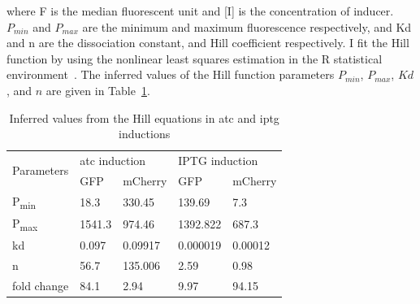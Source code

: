 \noindent where F is the median fluorescent unit and [I] is the concentration of inducer. $P_{min}$ and $P_{max}$ are the minimum and maximum fluorescence respectively, and Kd and n are the dissociation constant, and Hill coefficient respectively. I fit the Hill function by using the nonlinear least squares estimation in the R statistical environment~\autocite{R:2008}. The inferred values of the Hill function parameters $P_{min}$, $P_{max}$, $Kd$, and $n$ are given in Table~\ref{tab:hill_initial}.




\begin{table}[tb]
\centering
\caption{Inferred values from the Hill equations in \acrshort{atc} and \acrshort{iptg} inductions}
\label{tab:hill_initial}
\begin{tabular}{@{}lllll@{}}
\toprule
\multirow{2}{*}{Parameters} & \multicolumn{2}{l}{\acrshort{atc} induction} & \multicolumn{2}{l}{IPTG induction} \\ \cmidrule(l){2-5} 
 & GFP & mCherry & GFP & mCherry \\ \midrule
P\textsubscript{min} & 18.3 & 330.45 & 139.69 & 7.3 \\
P\textsubscript{max} & 1541.3 & 974.46 & 1392.822 & 687.3 \\
kd & 0.097 & 0.09917 & 0.000019 & 0.00012\\
n & 56.7 & 135.006 & 2.59 & 0.98\\ 
fold change & 84.1 & 2.94 & 9.97 & 94.15 \\ \bottomrule
\end{tabular}
\end{table}


